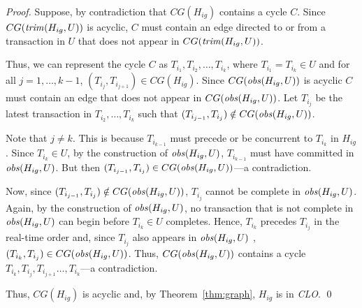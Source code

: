 \documentclass{llncs}
\newcommand{\id}[1]{\mbox{\textit{#1}}}\newcommand{\res}[1]{\mbox{\textbf{#1}}}
\newcommand{\clo} {\textit{CLO}}
\begin{document}
\begin{proof}
Suppose, by contradiction that $CG(H_{ig})$ contains a cycle $C$. 
Since $CG(\id{trim}(H_{ig},U))$ is acyclic, $C$ must contain an edge
directed to or from a transaction in $U$ that does not appear in $CG(\id{trim}(H_{ig},U))$.   

Thus, we can represent the cycle $C$ as
$T_{i_1},T_{i_2},\ldots,T_{i_k}$, where $T_{i_1}=T_{i_k}\in U$ and for all
$j=1,\ldots,k-1$, $(T_{i_j},T_{i_{j+1}})\in CG(H_{ig})$. 
Since  $CG(\id{obs}(H_{ig},U))$ is acyclic $C$ must contain an edge
that does not appear in $CG(\id{obs}(H_{ig},U))$. 
Let $T_{i_j}$ be the latest transaction in
$T_{i_2},\ldots,T_{i_k}$ such that $(T_{i_{j-1}},T_{i_j})\notin
CG(\id{obs}(H_{ig},U))$.

Note that $j\neq k$. This is because $T_{i_{k-1}}$
must precede or be concurrent to $T_{i_{k}}$ in $H_{ig}$. 
Since $T_{i_{k}}\in U$, by the construction of $\id{obs}(H_{ig},U)$,
$T_{i_{k-1}}$ must have committed in $\id{obs}(H_{ig},U)$.
But then $(T_{i_{j-1}},T_{i_j})\in CG(\id{obs}(H_{ig},U))$---a contradiction.

Now, since $(T_{i_{j-1}},T_{i_j})\notin
CG(\id{obs}(H_{ig},U))$, $T_{i_j}$ cannot be complete in
$\id{obs}(H_{ig},U)$.   
Again, by the construction of $\id{obs}(H_{ig},U)$, no transaction
that is not complete in $\id{obs}(H_{ig},U)$ can begin before
$T_{i_k}\in U$ completes. 
Hence, $T_{i_k}$ precedes $T_{i_j}$ in the real-time order and, since
$T_{i_j}$ also appears in $\id{obs}(H_{ig},U)$ , $(T_{i_{k}},T_{i_j})\in
CG(\id{obs}(H_{ig},U))$. 
Thus, $CG(\id{obs}(H_{ig},U))$ contains a cycle $T_{i_{k}},T_{i_j},
T_{i_{j+1}}\ldots,T_{i_k}$---a contradiction. 

Thus, $CG(H_{ig})$ is acyclic and, by Theorem~\ref{thm:graph}, $H_{ig}$
is in {\clo}. \qed
\end{proof}
\end{document}
